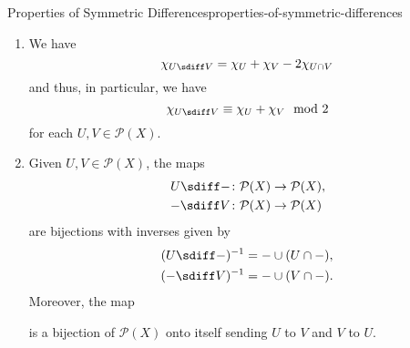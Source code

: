 \begin{proposition}{Properties of Symmetric Differences}{properties-of-symmetric-differences}
\begin{enumerate}
            \begin{align*}
                U\cap(V\sdiff W)  &= (U\cap V)\sdiff(U\cap W),\\
                (U\sdiff V)\cap W &= (U\cap W)\sdiff(V\cap W)
            \end{align*}
            for each $U,V,W\in\mathcal{P}(X)$.
        \item\label{properties-of-symmetric-differences-interaction-with-characteristic-functions}We have
            \[
                \chi_{U\sdiff V}%
                =%
                \chi_{U}%
                +%
                \chi_{V}%
                -%
                2\chi_{U\cap V}%
            \]%
            and thus, in particular, we have
            \[
                \chi_{U\sdiff V}%
                \equiv%
                \chi_{U}+\chi_{V}%
                \mod{2}%
            \]%
            for each $U,V\in\mathcal{P}(X)$.
        \item\label{properties-of-symmetric-differences-bijectivity}Given $U,V\in\mathcal{P}(X)$, the maps
            \begin{align*}
                U\sdiff-  &\colon \mathcal{P}(X) \to \mathcal{P}(X),\\
                -\sdiff V &\colon \mathcal{P}(X) \to \mathcal{P}(X)
            \end{align*}
            are bijections with inverses given by
            \begin{align*}
                (U\sdiff-)^{-1}  &= -\cup(U\cap-),\\
                (-\sdiff V)^{-1} &= -\cup(V\cap-).
            \end{align*}
            Moreover, the map
            \begin{webcompile}
            \end{webcompile}%
            is a bijection of $\mathcal{P}(X)$ onto itself sending $U$ to $V$ and $V$ to $U$.

\end{enumerate}
\end{proposition}
